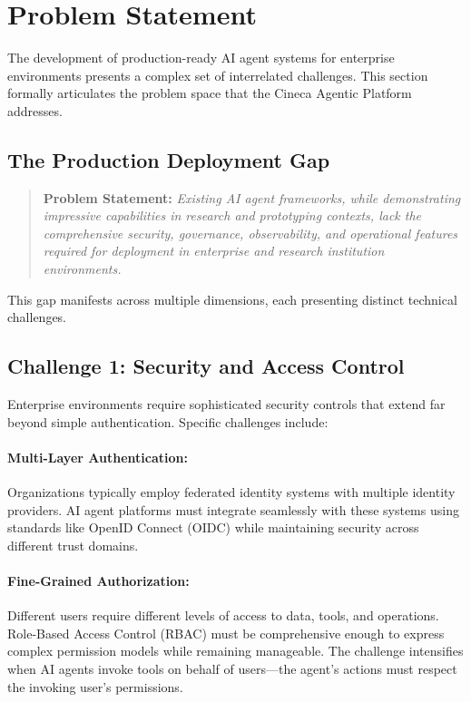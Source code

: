 
\section{Problem Statement}
\label{sec:problem-statement}

The development of production-ready AI agent systems for enterprise environments presents a complex set of interrelated challenges. This section formally articulates the problem space that the Cineca Agentic Platform addresses.

\subsection{The Production Deployment Gap}

\begin{quote}
\textbf{Problem Statement:} \emph{Existing AI agent frameworks, while demonstrating impressive capabilities in research and prototyping contexts, lack the comprehensive security, governance, observability, and operational features required for deployment in enterprise and research institution environments.}
\end{quote}

This gap manifests across multiple dimensions, each presenting distinct technical challenges.

\subsection{Challenge 1: Security and Access Control}

Enterprise environments require sophisticated security controls that extend far beyond simple authentication. Specific challenges include:

\paragraph{Multi-Layer Authentication:}
Organizations typically employ federated identity systems with multiple identity providers. AI agent platforms must integrate seamlessly with these systems using standards like OpenID Connect (OIDC) while maintaining security across different trust domains.

\paragraph{Fine-Grained Authorization:}
Different users require different levels of access to data, tools, and operations. Role-Based Access Control (RBAC) must be comprehensive enough to express complex permission models while remaining manageable. The challenge intensifies when AI agents invoke tools on behalf of users---the agent's actions must respect the invoking user's permissions.

